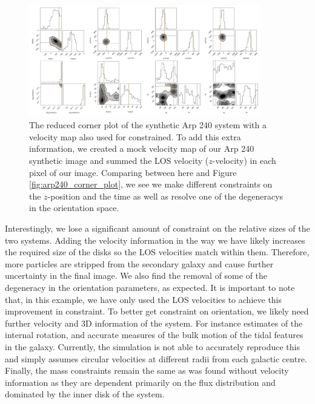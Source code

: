 \begin{figure}
\centering
\includegraphics[width=0.9\textwidth]{Chapter1/figures/Arp240_vel-red-corner.pdf}
\caption[The reduced corner plot of the synthetic Arp 240 system with a velocity map also used for constrained.]{The reduced corner plot of the synthetic Arp 240 system with a velocity map also used for constrained. To add this extra information, we created a mock velocity map of our Arp 240 synthetic image and summed the LOS velocity ($z$-velocity) in each pixel of our image. Comparing between here and Figure \ref{fig:arp240_corner_plot}, we see we make different constraints on the $z$-position and the time as well as resolve one of the degeneracys in the orientation space.}
\label{fig:velocity_corner_plot}
\end{figure}

Interestingly, we lose a significant amount of constraint on the relative sizes of the two systems. Adding the velocity information in the way we have likely increases the required size of the disks so the LOS velocities match within them. Therefore, more particles are stripped from the secondary galaxy and cause further uncertainty in the final image. We also find the removal of some of the degeneracy in the orientation parameters, as expected. It is important to note that, in this example, we have only used the LOS velocities to achieve this improvement in constraint. To better get constraint on orientation, we likely need further velocity and 3D information of the system. For instance estimates of the internal rotation, and accurate measures of the bulk motion of the tidal features in the galaxy. Currently, the simulation is not able to accurately reproduce this and simply assumes circular velocities at different radii from each galactic centre. Finally, the mass constraints remain the same as was found without velocity information as they are dependent primarily on the flux distribution and dominated by the inner disk of the system.


